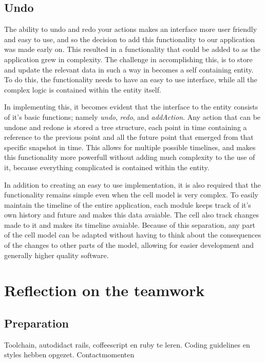 \documentclass[10pt,a4paper]{report}
\begin{document}
		\subsection{Undo}
			The ability to undo and redo your actions makes an interface more user friendly and easy to use, and so the decision to add this functionality to our application was made early on. This resulted in a functionality that could be added to as the application grew in complexity. The challenge in accomplishing this, is to store and update the relevant data in such a way in becomes a self containing entity. To do this, the functionality needs to have an easy to use interface, while all the complex logic is contained within the entity itself.
			
			In implementing this, it becomes evident that the interface to the entity consists of it's basic functions; namely \emph{undo}, \emph{redo}, and \emph{addAction}. Any action that can be undone and redone is stored a tree structure, each point in time containing a reference to the previous point and all the future point that emerged from that specific snapshot in time. This allows for multiple possible timelines, and makes this functionality more powerfull without adding much complexity to the use of it, because everything complicated is contained within the entity.

			In addition to creating an easy to use implementation, it is also required that the functionality remains simple even when the cell model is very complex. To easily maintain the timeline of the entire application, each module keeps track of it's own history and future and makes this data avaiable. The cell also track changes made to it and makes its timeline avaiable. Because of this separation, any part of the cell model can be adapted without having to think about the consequences of the changes to other parts of the model, allowing for easier development and generally higher quality software.
	
	\section{Reflection on the teamwork}
		
		\subsection{Preparation}
Toolchain, autodidact rails, coffeescript en ruby te leren. Coding guidelines en styles hebben opgezet. 
Contactmomenten
		
\end{document}
